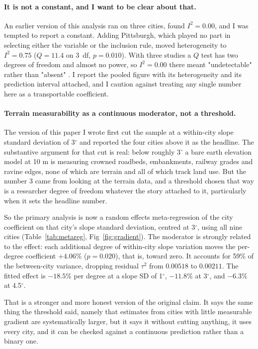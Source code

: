 \documentclass[10pt,letterpaper]{article}
\begin{document}
\paragraph{It is not a constant, and I want to be clear about that.} An earlier
version of this analysis ran on three cities, found $I^2 = 0.00$, and I was tempted to
report a constant. Adding Pittsburgh, which played no part in selecting either the
variable or the inclusion rule, moved heterogeneity to $I^2 = 0.75$ ($Q = 11.4$ on
3~df, $p = 0.010$). With three studies a $Q$ test has two degrees of freedom and
almost no power, so $I^2 = 0.00$ there meant "undetectable" rather than "absent"
\cite{higgins2002}. I report the pooled figure with its heterogeneity and its
prediction interval attached, and I caution against treating any single number here
as a transportable coefficient.

\paragraph{Terrain measurability as a continuous moderator, not a threshold.} The
version of this paper I wrote first cut the sample at a within-city slope standard
deviation of 3$^\circ$ and reported the four cities above it as the headline. The
substantive argument for that cut is real: below roughly 3$^\circ$ a bare earth
elevation model at 10 m is measuring crowned roadbeds, embankments, railway grades
and ravine edges, none of which are terrain and all of which track land use. But the
number 3 came from looking at the terrain data, and a threshold chosen that way is a
researcher degree of freedom whatever the story attached to it, particularly when it
sets the headline number.

So the primary analysis is now a random effects meta-regression of the city
coefficient on that city's slope standard deviation, centred at 3$^\circ$, using all
nine cities (Table~\ref{tab:metareg}, Fig~\ref{fig:gradient}). The moderator is
strongly related to the effect: each additional degree of within-city slope
variation moves the per-degree coefficient $+4.06\%$ ($p = 0.020$), that is, toward
zero. It accounts for 59\% of the between-city variance, dropping residual $\tau^2$
from $0.00518$ to $0.00211$. The fitted effect is $-18.5\%$ per degree at a slope SD
of 1$^\circ$, $-11.8\%$ at 3$^\circ$, and $-6.3\%$ at 4.5$^\circ$.

That is a stronger and more honest version of the original claim. It says the same
thing the threshold said, namely that estimates from cities with little measurable
gradient are systematically larger, but it says it without cutting anything, it uses
every city, and it can be checked against a continuous prediction rather than a
binary one.
\end{document}
